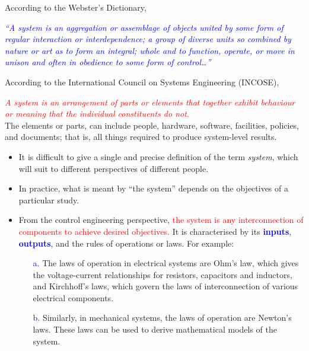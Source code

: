 \documentclass[
  12pt,
  a4paper,
]{report}
\begin{document}
According to the Webster's Dictionary, \\
\begin{tcolorbox}[colback=boxbodycol,colframe=boxheadcol]
    \begin{center}
        \textcolor{blue}{%
            \emph{``A system is an aggregation or assemblage of objects united by some form of regular interaction or interdependence; a group of diverse units so combined by nature or art as to form an integral; whole and to function, operate, or move in unison and often in obedience to some form of control\dots''}}
    \end{center}
\end{tcolorbox}\label{fig:system-def-webster}
According to the International Council on Systems Engineering (INCOSE),\\
\begin{tcolorbox}[colback=boxbodycol,colframe=boxheadcol]
    \begin{center}
        \textcolor{red}{%
            \emph{A system is an arrangement of parts or elements that together exhibit behaviour or meaning that the individual constituents do not.}}\\ The elements or parts, can include people, hardware, software, facilities, policies, and documents; that is, all things required to produce system-level results.
    \end{center}
\end{tcolorbox}\label{fig:system-def-incose}
\begin{center}
    \begin{itemize}
        \item It is difficult to give a single and precise definition of the term \emph{system}, which will suit to different perspectives of different people. \\
        \item In practice, what is meant by ``the system'' depends on the objectives of a particular study.\\
        \item From the control engineering perspective, \textcolor{red}{the system is any interconnection of components to achieve desired objectives.} It is characterised by its \textcolor{blue}{\textbf{inputs}}, \textcolor{blue}{\textbf{outputs}}, and the rules of operations or laws. For example:
              \begin{itemize}
                  \item[\textcolor{blue}{a.}] The laws of operation in electrical systems are Ohm's law, which gives the voltage-current relationships for resistors, capacitors and inductors, and Kirchhoff's laws, which govern the laws of interconnection of various electrical components.
                  \item[\textcolor{blue}{b.}] Similarly, in mechanical systems, the laws of operation are Newton's laws. These laws can be used to derive mathematical models of the system.
              \end{itemize}
    \end{itemize}
\end{center}
\newpage
\end{document}
